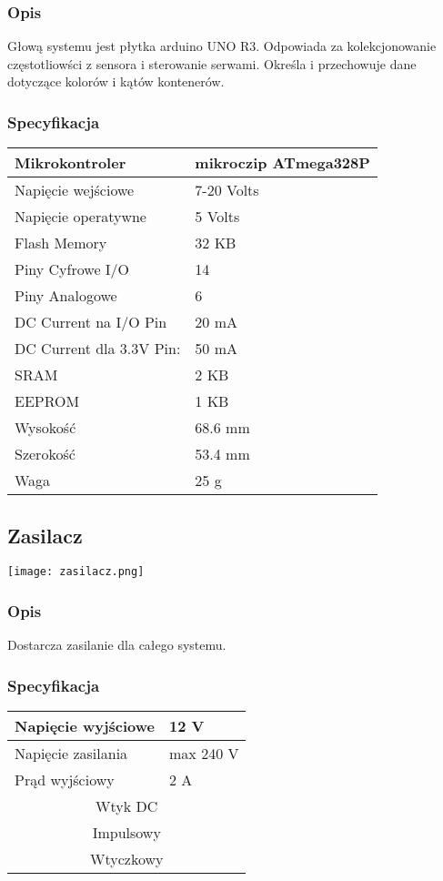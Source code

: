 \documentclass[12pt]{article}
\begin{document}
\subsubsection{Opis}
Głową systemu  jest płytka arduino UNO R3.  Odpowiada za kolekcjonowanie częstotliowści z sensora i sterowanie serwami. Określa i przechowuje dane dotyczące kolorów i kątów kontenerów.
\subsubsection{Specyfikacja}
\begin{center}
\begin{tabular}{ | m{5cm} | m{3cm} | } 
\hline
Mikrokontroler&mikroczip ATmega328P\\
\hline
Napięcie wejściowe &  7-20 Volts\\ 
\hline
Napięcie operatywne &  5 Volts\\ 
\hline
\hline
Flash Memory& 32 KB\\
\hline
Piny Cyfrowe I/O & 14\\  
\hline
Piny Analogowe & 6\\ 
\hline
DC Current na I/O Pin& 20 mA\\ 
\hline
DC Current dla 3.3V Pin:& 50 mA\\ 
\hline
SRAM& 2 KB\\ 
\hline
EEPROM& 1 KB\\ 
\hline
Wysokość &  68.6 mm  \\ 
\hline
Szerokość &  53.4 mm \\ 
\hline
Waga &  25 g  \\ 
\hline
\end{tabular}
\end{center}
\subsection{Zasilacz}
\begin{center}
\begin{minipage}[H]{.85\textwidth}
    \texttt{[image: zasilacz.png]}
\end{minipage}
\end{center}
\subsubsection{Opis}
Dostarcza zasilanie dla całego systemu.
\subsubsection{Specyfikacja}
\begin{center}
\begin{tabular}{ | m{5cm} | m{3cm} | } 
\hline
Napięcie wyjściowe &  12 V\\ 
\hline
Napięcie zasilania & max 240 V\\ 
\hline
Prąd wyjściowy& 2 A\\
\hline 
\multicolumn{2}{|c|}{Wtyk DC}\\
\hline 
\multicolumn{2}{|c|}{Impulsowy}\\
\hline  
\multicolumn{2}{|c|}{Wtyczkowy}\\ 
\hline
\end{tabular}
\end{center}
\end{document}
